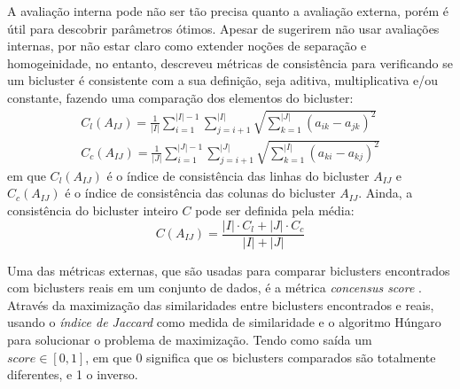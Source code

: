 \documentclass[normaltoc, espacoumemeio, pnumromarab,ruledheader]{abnt}
\begin{document}
    A avaliação interna pode não ser tão precisa quanto a avaliação externa, porém é útil para descobrir parâmetros ótimos. Apesar de  sugerirem não usar avaliações internas, por não estar claro como extender noções de separação e homogeinidade, no entanto,  descreveu métricas de consistência para verificando se um bicluster é consistente com a sua definição, seja aditiva, multiplicativa e/ou constante, fazendo uma comparação dos elementos do bicluster:
    \begin{equation}
    \begin{split}
    C_l(A_{IJ}) = \frac{1}{|I|} \displaystyle\sum_{i = 1}^{|I| - 1} \displaystyle\sum_{j = i + 1}^{|I|} \sqrt{ \displaystyle\sum_{k = 1}^{|J|} (a_{ik} - a_{jk})^2 } \\
    C_c(A_{IJ}) = \frac{1}{|J|} \displaystyle\sum_{i = 1}^{|J| - 1} \displaystyle\sum_{j = i + 1}^{|J|} \sqrt{ \displaystyle\sum_{k = 1}^{|I|} (a_{ki} - a_{kj})^2 }
    \end{split}
    \end{equation}
    em que $C_l(A_{IJ})$ é o índice de consistência das linhas do bicluster $A_{IJ}$ e $C_c(A_{IJ})$ é o índice de consistência das colunas do bicluster $A_{IJ}$. Ainda, a consistência do bicluster inteiro $C$ pode ser definida pela média:
    \begin{equation}
    C(A_{IJ}) = \frac{|I| \cdot C_l + |J| \cdot C_c}{|I| + |J|}
    \end{equation}

    Uma das métricas externas, que são usadas para comparar biclusters encontrados com biclusters reais em um conjunto de dados, é a métrica \textit{concensus score} \cite{Hochreiter2010}. Através da maximização das similaridades entre biclusters encontrados e reais, usando o \textit{índice de Jaccard} como medida de similaridade e o algoritmo Húngaro para solucionar o problema de maximização. Tendo como saída um $\textit{score} \in [0,1]$, em que 0 significa que os biclusters comparados são totalmente diferentes, e 1 o inverso.


\end{document}
